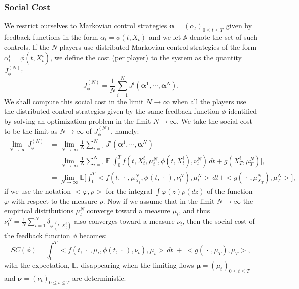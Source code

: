 \documentclass[11pt]{article}
\def\balpha{\boldsymbol{\alpha}}
\def\bmu{\boldsymbol{\mu}}
\def\bnu{\boldsymbol{\nu}}
\newcommand\EE{\mathbb E}
\begin{document}
\subsubsection*{\textbf{Social Cost}}
We restrict ourselves to Markovian control strategies $\balpha=(\alpha_t)_{0\le t\le T}$ given by feedback functions in the form $\alpha_t=\phi(t,X_{t})$ and we let $\mathbb{A}$ denote the set of such controls. If the $N$ players use distributed Markovian control strategies of the form $\alpha^i_t=\phi(t,X^i_t)$, we define the cost (per player) to the system as the quantity $J^{(N)}_\phi$:
\begin{equation*}
J^{(N)}_\phi=\frac1N\sum_{i=1}^NJ^i(\balpha^1,\cdots,\balpha^N).
\end{equation*}
We shall compute this social cost in the limit $N\to\infty$ when all the players use the distributed control strategies given by the same feedback function $\phi$ identified by solving an optimization problem in the limit $N\to\infty$. We take the social cost to be the limit as $N\to\infty$ of $J^{(N)}_\phi$, namely:
\begin{equation*}
\begin{split}
\lim_{N\to\infty}J^{(N)}_\phi
&=\lim_{N\to\infty}\frac1N\sum_{i=1}^NJ^i(\balpha^1,\cdots,\balpha^N)\\
&=\lim_{N\to\infty}\frac1N\sum_{i=1}^N\EE\bigg[\int_0^Tf(t,X^i_t,\mu^{N}_{t},\phi(t,X^i_t),\nu^{N}_{t})\,dt +g(X^i_T,\mu^{N}_{T})
\bigg],\\
&=\lim_{N\to\infty}\EE\bigg[\int_0^T<f(t,\,\cdot\,,\mu^{N}_{X_t},\phi(t,\,\cdot\,),\nu^{N}_{t}),\mu^N_{t}>\,dt +<g(\,\cdot\,,\mu^{N}_{X_T}),\mu^{N}_{T}>
\bigg],
\end{split}
\end{equation*}
if we use the notation $<\varphi,\rho>$ for the integral $\int \varphi(z)\rho(dz)$ of the function $\varphi$ with respect to the measure $\rho$. Now if we assume that in the limit $N\to\infty$ the empirical distributions $\mu^N_{t}$ converge toward a measure $\mu_t$, and thus $\nu^N_{t}=\frac1N\sum_{i=1}^N\delta_{\phi(t,X^i_t)}$ also converges toward a measure $\nu_t$, then the social cost of the feedback function $\phi$ becomes:
\begin{equation*}
SC(\phi)=\int_0^T<f(t,\,\cdot\,,\mu_t,\phi(t,\,\cdot\,),\nu_t),\mu_t>\,dt \;+\; <g(\,\cdot\,,\mu_T),\mu_T>,
\end{equation*}
with the expectation, $\EE$, disappearing when the limiting flows $\bmu=(\mu_t)_{0\le t\le T}$ and $\bnu=(\nu_t)_{0\le t\le T}$ are deterministic.
\end{document}
